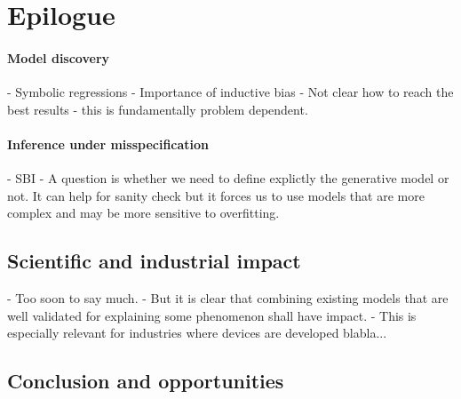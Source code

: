 \section{Epilogue}

\paragraph{Model discovery}
- Symbolic regressions
- Importance of inductive bias
- Not clear how to reach the best results - this is fundamentally problem dependent.
\paragraph{Inference under misspecification}
 - SBI
 - A question is whether we need to define explictly the generative model or not. It can help for sanity check but it forces us to use models that are more complex and may be more sensitive to overfitting.
\subsection{Scientific and industrial impact}
 - Too soon to say much.
 - But it is clear that combining existing models that are well validated for explaining some phenomenon shall have impact.
 - This is especially relevant for industries where devices are developed blabla...
\subsection{Conclusion and opportunities}
